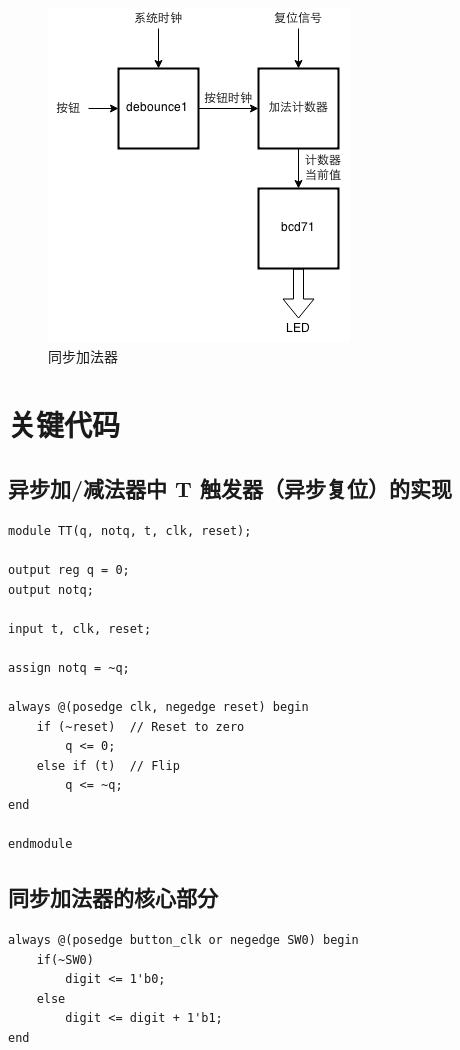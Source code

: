 \documentclass[11pt,a4paper]{article}
\begin{document}
\begin{figure}[H]
  \centering
    \includegraphics{exp1_syc_96_dpi}
  \caption{同步加法器}
\end{figure}


\section{关键代码}

\subsection{异步加/减法器中 T 触发器（异步复位）的实现}


\begin{verbatim}
module TT(q, notq, t, clk, reset);

output reg q = 0;
output notq;

input t, clk, reset;

assign notq = ~q;

always @(posedge clk, negedge reset) begin
    if (~reset)  // Reset to zero
        q <= 0;
    else if (t)  // Flip
        q <= ~q;
end

endmodule
\end{verbatim}

\subsection{同步加法器的核心部分}

\begin{verbatim}
always @(posedge button_clk or negedge SW0) begin
    if(~SW0)
        digit <= 1'b0;
    else
        digit <= digit + 1'b1;
end
\end{verbatim}
\end{document}
